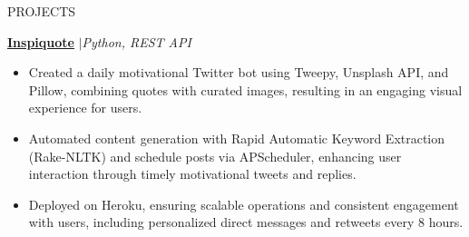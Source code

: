\documentclass{resume} %
\begin{document}
\begin{rSection}{PROJECTS}


\href{https://github.com/RutvikJ77/Inspiquote}{\textbf{\underline{Inspiquote}}} $|$\textit{Python, REST API}
\begin{itemize}
  \item Created a daily motivational Twitter bot using Tweepy, Unsplash API, and Pillow, combining quotes with curated images, resulting in an engaging visual experience for users.
  \item Automated content generation with Rapid Automatic Keyword Extraction (Rake-NLTK) and schedule posts via APScheduler, enhancing user interaction through timely motivational tweets and replies.
  \item Deployed on Heroku, ensuring scalable operations and consistent engagement with users, including personalized direct messages and retweets every 8 hours.
\end{itemize}


\end{rSection}
\end{document}
